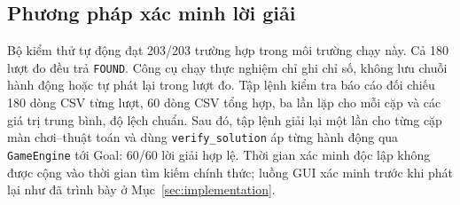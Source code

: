 \subsection{Phương pháp xác minh lời giải}

Bộ kiểm thử tự động đạt 203/203 trường hợp trong môi
trường chạy này. Cả 180 lượt đo đều trả \texttt{FOUND}. Công cụ chạy thực
nghiệm chỉ ghi chỉ số, không lưu chuỗi hành động hoặc tự phát lại trong lượt
đo. Tập lệnh kiểm tra báo cáo đối chiếu 180 dòng CSV từng lượt, 60 dòng CSV
tổng hợp, ba lần lặp cho mỗi cặp và các giá trị trung bình, độ lệch chuẩn. Sau
đó, tập lệnh giải lại một lần cho từng cặp màn chơi--thuật toán và dùng
\texttt{verify\_solution} áp từng hành động qua \texttt{GameEngine} tới Goal:
60/60 lời giải hợp lệ. Thời gian xác minh độc lập không được cộng vào thời gian
tìm kiếm chính thức; luồng GUI xác minh trước khi phát lại như đã trình bày ở
Mục~\ref{sec:implementation}.
